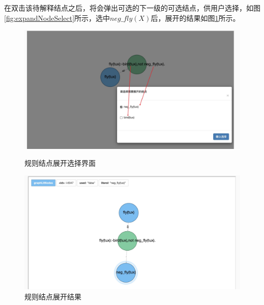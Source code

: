 在双击该待解释结点之后，将会弹出可选的下一级的可选结点，供用户选择，如图\ref{fig:expandNodeSelect}所示，选中$neg\_fly(X)$后，展开的结果如图\ref{fig:expandResult}所示。
\begin{figure}[htbp] 
    \centering 
    \begin{minipage}[t]{0.48\textwidth} 
        \centering 
        \includegraphics[width=\linewidth]{figures/具体展开.jpg} 
        \caption{规则结点展开选择界面} 
        \label{fig:expandNodeSelect} 
    \end{minipage} 
    \begin{minipage}[t]{0.48\textwidth} 
        \centering 
        \includegraphics[width=\linewidth]{figures/文字展开结果.jpg} 
        \caption{规则结点展开结果} 
        \label{fig:expandResult} 
    \end{minipage} 
\end{figure}

